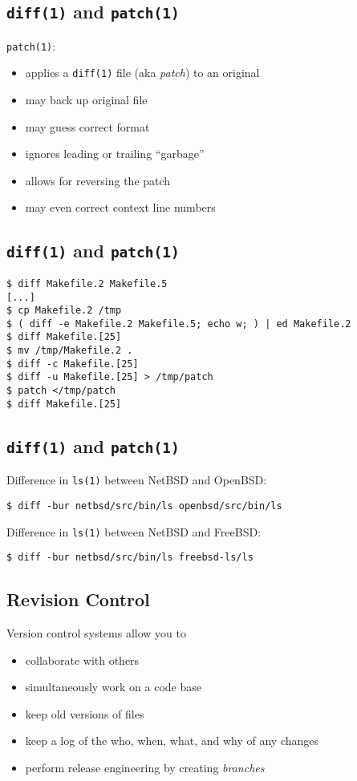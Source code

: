 \documentclass[xga]{xdvislides}
\begin{document}
\subsection{{\tt diff(1)} and {\tt patch(1)}}
{\tt patch(1)}:
\begin{itemize}
	\item applies a {\tt diff(1)} file (aka {\em patch}) to an original
	\item may back up original file
	\item may guess correct format
	\item ignores leading or trailing ``garbage''
	\item allows for reversing the patch
	\item may even correct context line numbers
\end{itemize}

\subsection{{\tt diff(1)} and {\tt patch(1)}}
\begin{verbatim}
$ diff Makefile.2 Makefile.5
[...]
$ cp Makefile.2 /tmp
$ ( diff -e Makefile.2 Makefile.5; echo w; ) | ed Makefile.2
$ diff Makefile.[25]
$ mv /tmp/Makefile.2 .
$ diff -c Makefile.[25]
$ diff -u Makefile.[25] > /tmp/patch
$ patch </tmp/patch
$ diff Makefile.[25]
\end{verbatim}

\subsection{{\tt diff(1)} and {\tt patch(1)}}
Difference in {\tt ls(1)} between NetBSD and OpenBSD:
\begin{verbatim}
$ diff -bur netbsd/src/bin/ls openbsd/src/bin/ls
\end{verbatim}

\addvspace{.5in}
Difference in {\tt ls(1)} between NetBSD and FreeBSD:
\begin{verbatim}
$ diff -bur netbsd/src/bin/ls freebsd-ls/ls
\end{verbatim}

\subsection{Revision Control}
Version control systems allow you to

\begin{itemize}
	\item collaborate with others
	\item simultaneously work on a code base
	\item keep old versions of files
	\item keep a log of the who, when, what, and why of any changes
	\item perform release engineering by creating {\em branches}
\end{itemize}
\end{document}
